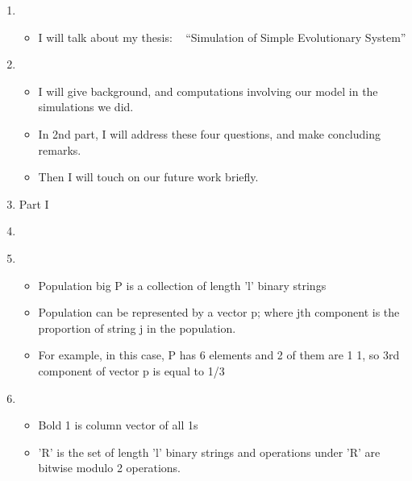 \documentclass{article}
\begin{document}
\setcounter{page}{1}    
\newlength{\mywidth}
\setlength{\mywidth}{0.9\linewidth}
\newlength{\myheight}
\setlength{\myheight}{0.5in}
    
\begin{enumerate}
\item
  \begin{itemize}
  \item I will talk about my thesis: \hfill\mbox{ }\linebreak
      ``Simulation of Simple Evolutionary System'' 
  \end{itemize}  
    
\item
  \begin{itemize}
  \item I will give background, and computations involving our model in the simulations we did.

  \item In 2nd part, I will address these four questions, and make concluding remarks.

  \item Then I will touch on our future work briefly.  
  \end{itemize}
  
\item Part I
  
\item
  \begin{itemize}
  
  \end{itemize}
  
\item
  \begin{itemize}
    \item Population big P is a collection of length 'l' binary strings 

  \item Population can be represented by a vector p; where jth component is the proportion of string j in the population.

    \item For example, in this case, P has 6 elements and 2 of them are 1 1, so 3rd component of vector p is equal to 1/3
  \end{itemize}
  
\item 
  \begin{itemize}
  \item Bold 1 is column vector of all 1s

 \item 'R' is the set of length 'l' binary strings and operations under 'R' are bitwise modulo 2 operations. 
 

\end{itemize}
\end{enumerate}
\end{document}

